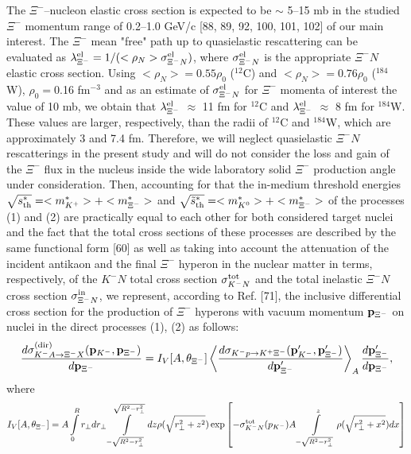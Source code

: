 \documentclass[12pt]{article}
\begin{document}
The $\Xi^-$--nucleon elastic cross section is expected to be $\sim$ 5--15 mb in the studied $\Xi^-$ momentum
range of 0.2--1.0 GeV/c [88, 89, 92, 100, 101, 102] of our main interest. The $\Xi^-$ mean "free" path up to
quasielastic rescattering can be evaluated as $\lambda^{\rm el}_{\Xi^-}=1/(<\rho_N>\sigma^{\rm el}_{\Xi^-N})$,
where $\sigma^{\rm el}_{\Xi^-N}$ is the appropriate $\Xi^-N$ elastic cross section. Using
$<\rho_N>=0.55\rho_0$ ($^{12}$C) and $<\rho_N>=0.76\rho_0$ ($^{184}$W), $\rho_0=$0.16 fm$^{-3}$ and as an
estimate of $\sigma^{\rm el}_{\Xi^-N}$ for $\Xi^-$ momenta of interest the value of 10 mb, we obtain that
$\lambda^{\rm el}_{\Xi^-}$ $\approx$ 11 fm for $^{12}$C and $\lambda^{\rm el}_{\Xi^-}$ $\approx$ 8 fm for $^{184}$W.
These values are larger, respectively, than the radii of $^{12}$C and $^{184}$W, which are approximately 3 and 7.4 fm.
Therefore, we will neglect quasielastic $\Xi^-N$ rescatterings in the present study and will do not consider
the loss and gain of the $\Xi^-$ flux in the nucleus inside the wide laboratory solid $\Xi^-$ production angle
under consideration. Then, accounting for that the in-medium threshold energies
$\sqrt{s^*_{\rm th}}=<m_{K^+}^*>+<m_{\Xi^-}^*>$ and $\sqrt{{\tilde s}^*_{\rm th}}=<m_{K^0}^*>+<m_{\Xi^-}^*>$
of the processes (1) and (2) are practically equal to each other for both considered target nuclei and the
fact that the total cross sections of these processes are described by the same functional form [60] as well as
taking into account the attenuation of the incident antikaon and the final $\Xi^-$ hyperon
in the nuclear matter in terms, respectively, of the $K^-N$ total cross section $\sigma_{{K^-}N}^{\rm tot}$
and the total inelastic $\Xi^-N$ cross section $\sigma_{{\Xi^-}N}^{\rm in}$, we represent, according to Ref. [71],
the inclusive differential cross section for the production of $\Xi^-$ hyperons with vacuum momentum
${\bf p}_{\Xi^-}$ on nuclei in the direct processes (1), (2) as follows:
\begin{equation}
\frac{d\sigma_{{K^-}A \to {\Xi^-}X}^{({\rm dir})}
({\bf p}_{K^-},{\bf p}_{\Xi^-})}
{d{\bf p}_{\Xi^-}}=I_{V}[A,\theta_{\Xi^-}]
\left<\frac{d\sigma_{{K^-}p\to K^+{{\Xi^-}}}({\bf p}^{\prime}_{K^-},
{\bf p}^{\prime}_{{\Xi^-}})}{d{\bf p}^{\prime}_{{\Xi^-}}}\right>_A\frac{d{\bf p}^{\prime}_{{\Xi^-}}}
{d{\bf p}_{{\Xi^-}}},
\end{equation}
where
\begin{equation}
I_{V}[A,\theta_{{\Xi^-}}]=A\int\limits_{0}^{R}r_{\bot}dr_{\bot}
\int\limits_{-\sqrt{R^2-r_{\bot}^2}}^{\sqrt{R^2-r_{\bot}^2}}dz
\rho(\sqrt{r_{\bot}^2+z^2})
\exp{\left[-\sigma_{{K^-}N}^{\rm tot}(p_{K^-})A\int\limits_{-\sqrt{R^2-r_{\bot}^2}}^{z}
\rho(\sqrt{r_{\bot}^2+x^2})dx\right]}
\end{equation}
\end{document}

